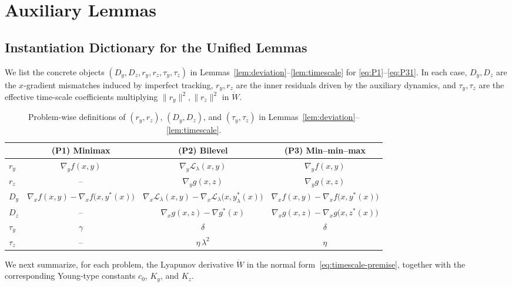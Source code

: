 \documentclass{article}
\newcommand{\1}{\mathbf{1}}
\begin{document}


\clearpage
\clearpage
\appendix
\section{Auxiliary Lemmas}
\subsection{Instantiation Dictionary for the Unified Lemmas}\label{app:diction}
We list the concrete objects $(D_y,D_z,r_y,r_z,\tau_y,\tau_z)$ in
Lemmas~\ref{lem:deviation}--\ref{lem:timescale} for \ref{eq:P1}--\ref{eq:P31}. In each case, $D_y,D_z$ are the $x$-gradient
mismatches induced by imperfect tracking, $r_y,r_z$ are the inner residuals driven by the auxiliary dynamics, and $\tau_y,\tau_z$ are the effective time-scale coefficients multiplying $\|r_y\|^2,\|r_z\|^2$ in $\dot W$.


\begin{table}[h]
\centering
\small
\setlength{\tabcolsep}{4.0pt}
\begin{tabular}{@{}lccc@{}}
\toprule
 & (P1) Minimax & (P2) Bilevel & (P3) Min--min--max \\
\midrule
$r_y$ &
$\nabla_y f(x,y)$ &
$\nabla_y \mathcal L_\lambda(x,y)$ &
$\nabla_y f(x,y)$ \\

$r_z$ &
-- &
$\nabla_y g(x,z)$ &
$\nabla_y g(x,z)$ \\

$D_y$ &
$\nabla_x f(x,y)-\nabla_x f\bigl(x,y^*(x)\bigr)$ &
$\nabla_x \mathcal L_\lambda(x,y)-\nabla_x \mathcal L_\lambda\bigl(x,y_\lambda^*(x)\bigr)$ &
$\nabla_x f(x,y)-\nabla_x f\bigl(x,y^*(x)\bigr)$ \\

$D_z$ &
-- &
$\nabla_x g(x,z)-\nabla g^*(x)$ &
$\nabla_x g(x,z)-\nabla_x g\bigl(x,z^*(x)\bigr)$ \\

$\tau_y$ &
$\gamma$ &
$\delta$ &
$\delta$ \\

$\tau_z$ &
-- &
$\eta\,\lambda^{2}$ &
$\eta$ \\
\bottomrule
\end{tabular}
\caption{Problem-wise definitions of $(r_y,r_z)$, $(D_y,D_z)$, and $(\tau_y,\tau_z)$ in Lemmas~\ref{lem:deviation}--\ref{lem:timescale}.}
\label{tab:normal-form-dictionary_long}
\end{table}

We next summarize, for each problem, the Lyapunov derivative $\dot W$ in the normal form~\eqref{eq:timescale-premise},
together with the corresponding Young-type constants $c_0$, $K_y$, and $K_z$.
\end{document}
